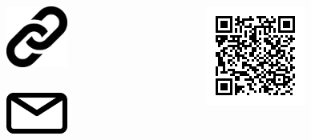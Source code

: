 \begin{columns}[c]
	\begin{column}{0.7\textwidth}
		\begin{columns}[c]
			\begin{column}{0.2\textwidth}
				\begin{figure}[h]
					\includegraphics[width=2cm]{icons/url.pdf}
				\end{figure}
			\end{column}
			\begin{column}{0.8\textwidth}
				\large{
					\color{boxbkseablue}
					\textbf{\getUrlList}
				}
			\end{column}
		\end{columns}
		\vskip0.5cm
		\begin{columns}[c]
			\begin{column}{0.2\textwidth}
				\begin{figure}[h]
					\includegraphics[width=2cm]{icons/mail.pdf}
				\end{figure}
			\end{column}
			\begin{column}{0.8\textwidth}
				\large{ 
					\color{boxbkseablue}
					\textbf{\getContactsList}
				}
			\end{column}
		\end{columns}
	\end{column}
	\begin{column}{0.3\textwidth}
		\begin{figure}[h]
			\includegraphics[width=0.6\columnwidth]{docs/imgs/poc.png}
		\end{figure}
		\hfill
	\end{column}
\end{columns}
\vskip1cm